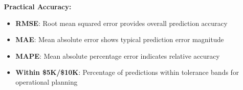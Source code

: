 \textbf{Practical Accuracy:}
\begin{itemize}
    \item \textbf{RMSE}: Root mean squared error provides overall prediction accuracy
    \item \textbf{MAE}: Mean absolute error shows typical prediction error magnitude
    \item \textbf{MAPE}: Mean absolute percentage error indicates relative accuracy
    \item \textbf{Within \$5K/\$10K}: Percentage of predictions within tolerance bands for operational planning
\end{itemize}







